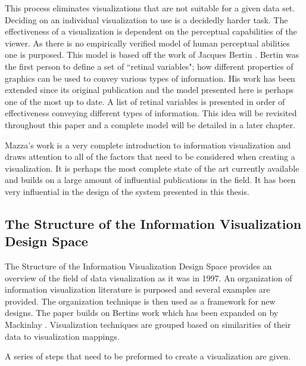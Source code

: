 \documentclass[a4paper, 11pt, titlepage, onehalfspacing]{report}
\begin{document}
This process eliminates visualizations that are not suitable for a given data set. Deciding on an individual visualization to use is a decidedly harder task. The effectiveness of a visualization is dependent on the perceptual capabilities of the viewer. As there is no empirically verified model of human perceptual abilities one is purposed. This model is based off the work of Jacques Bertin \cite{bertin1973semiologie}. Bertin was the first person to define a set of ``retinal variables"; how different properties of graphics can be used to convey various types of information. His work has been extended since its original publication and the model presented here is perhaps one of the most up to date. A list of retinal variables is presented in order of effectiveness conveying different types of information. This idea will be revisited throughout this paper and a complete model will be detailed in a later chapter. 

Mazza's work is a very complete introduction to information visualization and draws attention to all of the factors that need to be considered when creating a visualization. It is perhaps the most complete state of the art currently available and builds on a large amount of influential publications in the field. It has been very influential in the design of the system presented in this thesis.


		\subsection{The Structure of the Information Visualization Design Space}

The Structure of the Information Visualization Design Space provides an overview of the field of data visualization as it was in 1997. An organization of information visualization literature is purposed and several examples are provided. The organization technique is then used as a framework for new designs. The paper builds on Bertins work \cite{bertin1973semiologie} which has been expanded on by Mackinlay \cite{mackinlay1986automating}. Visualization techniques are grouped based on similarities of their data to visualization mappings.

A series of steps that need to be preformed to create a visualization are given. 
\end{document}
